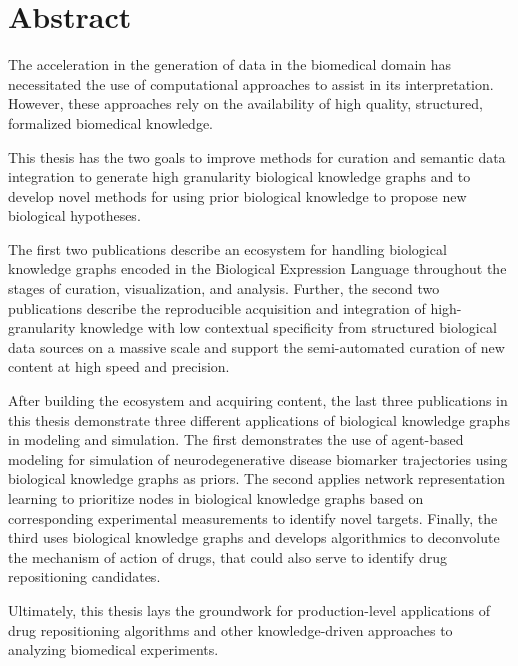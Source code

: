 \chapter*{Abstract}

The acceleration in the generation of data in the biomedical domain has necessitated the use of computational approaches to assist in its interpretation.
However, these approaches rely on the availability of high quality, structured, formalized biomedical knowledge.

This thesis has the two goals to improve methods for curation and semantic data integration to generate high granularity biological knowledge graphs and to develop novel methods for using prior biological knowledge to propose new biological hypotheses.

The first two publications describe an ecosystem for handling biological knowledge graphs encoded in the Biological Expression Language throughout the stages of curation, visualization, and analysis.
Further, the second two publications describe the reproducible acquisition and integration of high-granularity knowledge with low contextual specificity from structured biological data sources on a massive scale and support the semi-automated curation of new content at high speed and precision.

After building the ecosystem and acquiring content, the last three publications in this thesis demonstrate three different applications of biological knowledge graphs in modeling and simulation.
The first demonstrates the use of agent-based modeling for simulation of neurodegenerative disease biomarker trajectories using biological knowledge graphs as priors.
The second applies network representation learning to prioritize nodes in biological knowledge graphs based on corresponding experimental measurements to identify novel targets.
Finally, the third uses biological knowledge graphs and develops algorithmics to deconvolute the mechanism of action of drugs, that could also serve to identify drug repositioning candidates.

Ultimately, this thesis lays the groundwork for production-level applications of drug repositioning algorithms and other knowledge-driven approaches to analyzing biomedical experiments.
